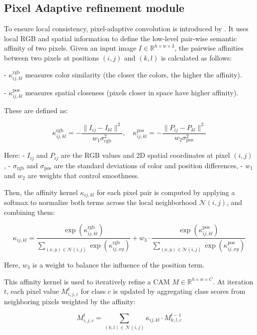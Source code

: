 \subsection{Pixel Adaptive refinement module}
\label{subsec:par}
To ensure local consistency, pixel-adaptive convolution is introduced by \cite{wsss_afa_affinity_from_attention}. It uses local RGB and spatial information to define the low-level pair-wise semantic affinity of two pixels. Given an input image \( I \in \mathbb{R}^{h \times w \times 3} \), the pairwise affinities between two pixels at positions \((i, j)\) and \((k, l)\) is calculated as follows:

- \( \kappa^{\text{rgb}}_{ij,kl} \) measures color similarity (the closer the colors, the higher the affinity).

- \( \kappa^{\text{pos}}_{ij,kl} \) measures spatial closeness (pixels closer in space have higher affinity).

These are defined as:

\[
    \kappa^{\text{rgb}}_{ij,kl} = -\frac{\| I_{ij} - I_{kl} \|^2}{w_1 \sigma^2_{\text{rgb}}}, \quad
    \kappa^{\text{pos}}_{ij,kl} = -\frac{\| P_{ij} - P_{kl} \|^2}{w_2 \sigma^2_{\text{pos}}}
\]

Here:
- \( I_{ij} \) and \( P_{ij} \) are the RGB values and 2D spatial coordinates at pixel \((i, j)\),
- \( \sigma_{\text{rgb}} \) and \( \sigma_{\text{pos}} \) are the standard deviations of color and position differences,
- \( w_1 \) and \( w_2 \) are weights that control smoothness.

Then, the affinity kernel \( \kappa_{ij,kl} \) for each pixel pair is computed by applying a softmax to normalize both terms across the local neighborhood \( \mathcal{N}(i, j) \), and combining them:

\[
    \kappa_{ij,kl} = \frac{ \exp(\kappa^{\text{rgb}}_{ij,kl}) }{ \sum\limits_{(x, y) \in \mathcal{N}(i, j)} \exp(\kappa^{\text{rgb}}_{ij,xy}) }
    + w_3 \cdot \frac{ \exp(\kappa^{\text{pos}}_{ij,kl}) }{ \sum\limits_{(x, y) \in \mathcal{N}(i, j)} \exp(\kappa^{\text{pos}}_{ij,xy}) }
\]

Here, \( w_3 \) is a weight to balance the influence of the position term.

This affinity kernel is used to iteratively refine a CAM \( M \in \mathbb{R}^{h \times w \times C} \). At iteration \( t \), each pixel value \( M^t_{i,j,c} \) for class \( c \) is updated by aggregating class scores from neighboring pixels weighted by the affinity:

\begin{equation}
    M^t_{i,j,c} = \sum_{(k, l) \in \mathcal{N}(i, j)} \kappa_{ij,kl} \cdot M^{t-1}_{k,l,c}
\end{equation}


